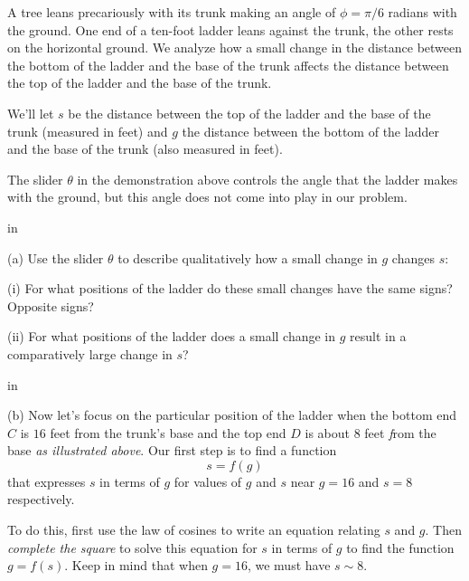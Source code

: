 \documentclass{ximera}
\newcommand{\pskip}{\vskip 0.1 in}
\begin{document}
\begin{example}  \label{Ex324trertg}

A tree leans precariously with its trunk making an angle of $\phi = \pi/6$ radians with the ground. One end of a ten-foot ladder leans against the trunk, the other rests on the horizontal ground. We analyze how a small change in the distance between the bottom of the ladder and the base of the trunk affects the distance between the top of the ladder and the base of the trunk.


 
\begin{onlineOnly}
    \begin{center}
\end{center}
\end{onlineOnly}

We'll let $s$ be the distance between the top of the ladder and the base of the trunk (measured in feet) and $g$ the distance between the bottom of the ladder and the base of the trunk (also measured in feet).

The slider $\theta$ in the demonstration above controls the angle that the ladder makes with the ground, but this angle does not come into play in our problem.

\pskip

(a) Use the slider $\theta$ to describe qualitatively how a small change in $g$ changes $s$:

(i) For what positions of the ladder do these small changes have the same signs? Opposite signs?

(ii) For what positions of the ladder does a small change in $g$ result in a comparatively large change in $s$?

\pskip

(b) Now let's focus on the particular position of the ladder when the bottom end $C$ is $16$ feet from the trunk's base and the top end $D$ is about $8$ feet \emph from the base \emph{as illustrated above}. Our first step is to find a function 
\[
    s = f(g) 
\]
that expresses $s$ in terms of $g$ for values of $g$ and $s$ near $g=16$ and $s=8$ respectively. 

To do this, first use the law of cosines to write an equation relating $s$ and $g$. Then \emph{complete the square} to solve this equation for $s$ in terms of $g$ to find the function $g = f(s)$. Keep in mind that when $g=16$, we must have $s\sim 8$. %



\end{example}
\end{document}
